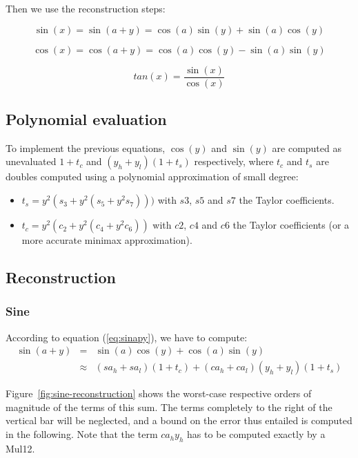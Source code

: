Then we use the reconstruction steps:

\begin{equation}
  \sin(x) = \sin(a + y) =  \cos(a) \sin(y) +  \sin(a) \cos(y)
  \label{eq:sinapy}
\end{equation}

\begin{equation}
  \cos(x) = \cos(a + y) = \cos(a) \cos(y) -  \sin(a) \sin(y)
  \label{eq:cosapy}
\end{equation}

\begin{equation}
  tan(x) = \frac{\sin(x)}{\cos(x)}
  \label{eq:tanapy}
\end{equation}


\subsection{Polynomial evaluation}


To implement the previous equations, $\cos(y)$ and $\sin(y)$ are
computed as unevaluated $1+t_c$ and $(y_h+y_l)(1+t_s)$ respectively,
where $t_c$ and $t_s$ are doubles computed using a polynomial
approximation of small degree:

\begin{itemize}
\item $t_s = y^2(s_3 + y^2(s_5 + y^2s_7)))$ with $s3$, $s5$ and
$s7$ the Taylor coefficients.
\item $t_c = y^2(c_2 + y^2(c_4 + y^2c_6))$ with $c2$, $c4$ and $c6$ the
Taylor coefficients (or a more accurate minimax approximation).
\end{itemize}



\subsection{Reconstruction}

\subsubsection{Sine}
According to equation (\ref{eq:sinapy}), we have to compute:
 \begin{eqnarray*}
  \sin(a+y) &=& \sin(a) \cos(y)  + \cos(a)\sin(y)  \\
  & \approx& (sa_h+sa_l)(1+t_c) + (ca_h+ca_l)(y_h+y_l)(1+t_s)
\end{eqnarray*}


Figure~\ref{fig:sine-reconstruction} shows the worst-case respective
orders of magnitude of the terms of this sum. The terms completely to the
right of the vertical bar will be neglected, and a bound on the
error thus entailed is computed in the following. Note that the term
$ca_hy_h$ has to be computed exactly by a Mul12.

